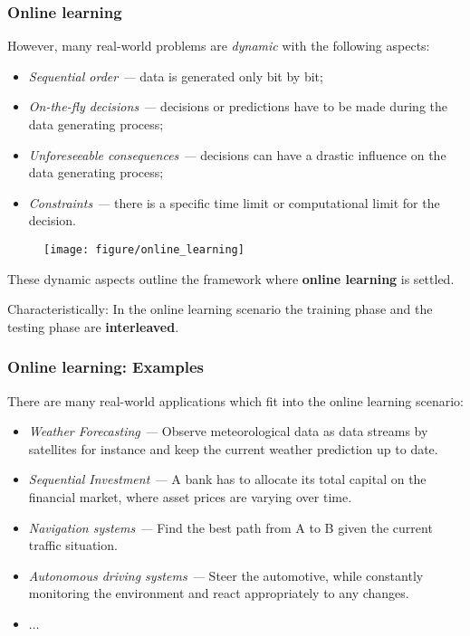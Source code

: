 \documentclass[11pt,compress,t,notes=noshow, xcolor=table]{beamer}
\begin{document}
\begin{frame}[t]
	\frametitle{Online learning}
%	
\begin{itemize} \small
%	
  	\item However, many real-world problems are \emph{dynamic} with the following aspects:
	\lz
	
	\begin{minipage}{.6\textwidth}
	\begin{itemize} \small
		\item \emph{Sequential order ---} data is generated only bit by bit;
		\item \emph{On-the-fly decisions ---} decisions or predictions have to be made during the data generating process;
		\item \emph{Unforeseeable consequences ---} decisions can have a drastic influence on the data generating process;
		\item \emph{Constraints ---} there is a specific time limit or computational limit for the decision.
	\end{itemize}
	\end{minipage}
	\begin{minipage}{.3\textwidth}
		\begin{figure}
		\centering
		\texttt{[image: figure/online\_learning]}
		\end{figure}
	\end{minipage}
	\lz
	{ {	\item These dynamic aspects outline the framework where \textbf{online learning} is settled. 
	\item Characteristically: In the online learning scenario the training phase and the testing phase are \textbf{interleaved}.}}
	\end{itemize}
%	
\end{frame}


\begin{frame}
	\frametitle{Online learning: Examples}
	\small
	There are many real-world applications which fit into the online learning scenario:
	\begin{itemize} \small
		  \item \emph{Weather Forecasting ---} Observe meteorological data as data streams by satellites for instance and keep the current weather prediction up to date.
			\pause
		  \item \emph{Sequential Investment ---} A bank has to allocate its total capital on the financial market, where asset prices are varying over time.
		\pause
		  \item \emph{Navigation systems ---} Find the best path from A to B given the current traffic situation.
		\pause
		  \item \emph{Autonomous driving systems ---} Steer the automotive, while constantly monitoring the environment and react appropriately to any changes.
		  \item $\ldots$
%		  
	\end{itemize}
\end{frame}
\end{document}

